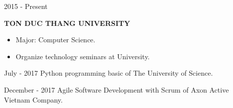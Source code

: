 
\begin{scholarship}
	\scholarshipentry%
		{2015 - Present}
		{
			\textbf{TON DUC THANG UNIVERSITY}
			\begin{itemize}
				\item Major: Computer Science.
				\item Organize technology seminars at University.
			\end{itemize}		
		}
	\scholarshipentry%
		{July - 2017}
		{
			Python programming basic of The University of Science.
		}
	
	\scholarshipentry%
		{December - 2017}
		{
			Agile Software Development with Scrum of Axon Active Vietnam Company.	
		}
\end{scholarship}

